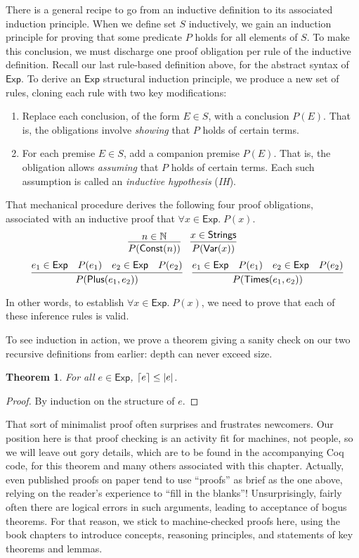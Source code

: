 \documentclass{amsbook}
\newtheorem{theorem}{Theorem}[chapter]
\theoremstyle{definition}
\theoremstyle{remark}
\numberwithin{section}{chapter}
\numberwithin{equation}{chapter}
\begin{document}
There is a general recipe to go from an inductive definition to its associated induction principle.
When we define set $S$ inductively, we gain an induction principle for proving that some predicate $P$ holds for all elements of $S$.
To make this conclusion, we must discharge one proof obligation per rule of the inductive definition.
Recall our last rule-based definition above, for the abstract syntax of $\mathsf{Exp}$.
To derive an $\mathsf{Exp}$ structural induction principle, we produce a new set of rules, cloning each rule with two key modifications:
\begin{enumerate}
  \item Replace each conclusion, of the form $E \in S$, with a conclusion $P(E)$.  That is, the obligations involve \emph{showing} that $P$ holds of certain terms.
  \item For each premise $E \in S$, add a companion premise $P(E)$.  That is, the obligation allows \emph{assuming} that $P$ holds of certain terms.  Each such assumption is called an \emph{inductive hypothesis} (\emph{IH}).
\end{enumerate}

That mechanical procedure derives the following four proof obligations, associated with an inductive proof that $\forall x \in \mathsf{Exp}. \; P(x)$.
$$\infer{P(\mathsf{Const}(n))}{
  n \in \mathbb N
}
\quad \infer{P(\mathsf{Var}(x))}{
  x \in \mathsf{Strings}
}$$
$$\quad \infer{P(\mathsf{Plus}(e_1, e_2))}{
  e_1 \in \mathsf{Exp}
  & P(e_1)
  & e_2 \in \mathsf{Exp}
  & P(e_2)
}
\quad \infer{P(\mathsf{Times}(e_1, e_2))}{
  e_1 \in \mathsf{Exp}
  & P(e_1)
  & e_2 \in \mathsf{Exp}
  & P(e_2)
}$$

In other words, to establish $\forall x \in \mathsf{Exp}. \; P(x)$, we need to prove that each of these inference rules is valid.

To see induction in action, we prove a theorem giving a sanity check on our two recursive definitions from earlier: depth can never exceed size.
\begin{theorem}
  For all $e \in \mathsf{Exp}$, ${\left \lceil e \right \rceil} \leq {\left \lvert e \right \rvert}$.
\end{theorem}
\begin{proof}
  By induction on the structure of $e$.
\end{proof}

That sort of minimalist proof often surprises and frustrates newcomers.
Our position here is that proof checking is an activity fit for machines, not people, so we will leave out gory details, which are to be found in the accompanying Coq code, for this theorem and many others associated with this chapter.
Actually, even published proofs on paper tend to use ``proofs'' as brief as the one above, relying on the reader's experience to ``fill in the blanks''!
Unsurprisingly, fairly often there are logical errors in such arguments, leading to acceptance of bogus theorems.
For that reason, we stick to machine-checked proofs here, using the book chapters to introduce concepts, reasoning principles, and statements of key theorems and lemmas.
\end{document}
